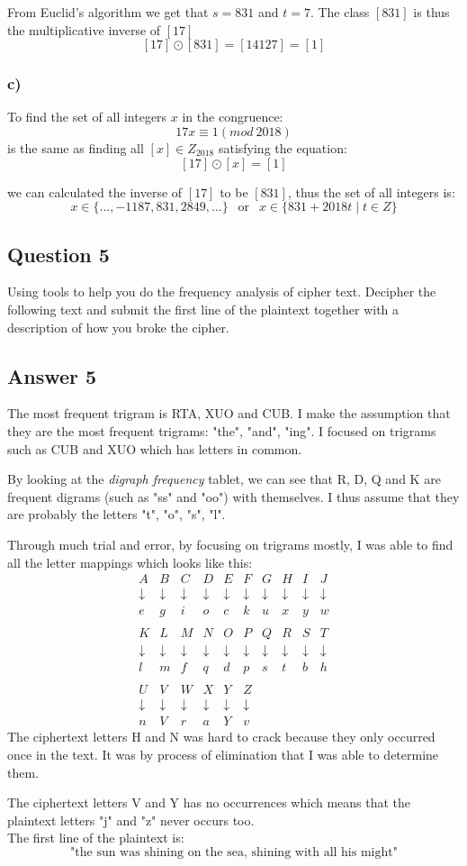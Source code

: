 \documentclass{article}
\begin{document}
	From Euclid's algorithm we get that $s = 831$ and $t=7$. The class $[831]$ is thus the multiplicative inverse of $[17]$ 
	$$
	[17] \odot [831] = [14127] = [1]
	$$
	
	\subsubsection*{c)}
	To find the set of all integers $x$ in the congruence:
	$$
	17x \equiv 1 (mod \ 2018)
	$$
	is the same as finding all $[x] \in Z_{2018}$ satisfying the equation:
	$$
	[17] \odot [x] = [1]
	$$
	
	we can calculated the inverse of $[17]$ to be $[831]$, thus the set of all integers is:
	$$
	x \in \{...,-1187,831,2849,...\} \ \ \text{ or } \ \ x \in \{831+2018t \mid t \in Z\}
	$$
	
	\subsection*{Question 5}
	Using tools to help you do the frequency analysis of cipher text. Decipher the following text and submit the first line of the plaintext together with a description of how you broke the cipher.
	
	\subsection*{Answer 5} 
	The most frequent trigram is RTA, XUO and CUB. I make the assumption that they are the most frequent trigrams: "the", "and", "ing". I focused on trigrams such as CUB and XUO which has letters in common.
	
	By looking at the \textit{digraph frequency} tablet, we can see that R, D, Q and K are frequent digrams (such as "ss" and "oo")  with themselves. I thus assume that they are probably the letters "t", "o", "s", "l".
	
	Through much trial and error, by focusing on trigrams mostly, I was able to find all the letter mappings which looks like this:
	\[
	\begin{matrix}
	A&B&C&D&E&F&G&H&I&J \\ 
	\downarrow&\downarrow&\downarrow&\downarrow&\downarrow&\downarrow&\downarrow&\downarrow&\downarrow&\downarrow \\
	e&g&i&o&c&k&u&x&y&w \\ \\
	K&L&M&N&O&P&Q&R&S&T \\ 
	\downarrow&\downarrow&\downarrow&\downarrow&\downarrow&\downarrow&\downarrow&\downarrow&\downarrow&\downarrow \\
	l&m&f&q&d&p&s&t&b&h \\ \\
	U&V&W&X&Y&Z \\
	\downarrow&\downarrow&\downarrow&\downarrow&\downarrow&\downarrow \\
	n&V&r&a&Y&v 
	\end{matrix}
	\]
	The ciphertext letters H and N was hard to crack because they only occurred once in the text. It was by process of elimination that I was able to determine them.
	
	The ciphertext letters V and Y has no occurrences which means that the plaintext letters "j" and "z" never occurs too. \\
	
	The first line of the plaintext is: 
	$$
	\text{"the sun was shining on the sea, shining with all his might"}
	$$
	
\end{document}
